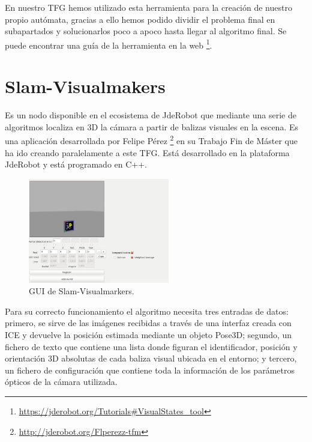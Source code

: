 \hspace{1cm} En nuestro TFG hemos utilizado esta herramienta para la creación de nuestro propio autómata, gracias a ello hemos podido dividir el problema final en subapartados y solucionarlos poco a apoco hasta llegar al algoritmo final. Se puede encontrar una guía de la herramienta en la web \footnote{\url{https://jderobot.org/Tutorials\#VisualStates_tool}}.

\section{Slam-Visualmakers}
\hspace{1cm} Es un nodo disponible en el ecosistema de JdeRobot que mediante una serie de algoritmos localiza en 3D la cámara a partir de balizas visuales en la escena. Es una aplicación desarrollada por Felipe Pérez \footnote{\url{http://jderobot.org/Flperezz-tfm}} en su Trabajo Fin de Máster que ha ido creando paralelamente a este TFG. Está desarrollado en la plataforma JdeRobot y está programado en C++. 

\begin{figure}[H]
	\begin{center}
		\includegraphics[width=0.55\textwidth]{imag/IMG24.png}
				\caption{GUI de Slam-Visualmarkers.} 
	\label{fig:GUI de Slam-Visualmarkers.}	
	\end{center}
\end{figure}


\hspace{1cm} Para su correcto funcionamiento el algoritmo necesita tres entradas de datos: primero, se sirve de las imágenes recibidas a través de una interfaz creada con ICE y devuelve la posición estimada mediante un objeto Pose3D; segundo, un fichero de texto que contiene una lista donde figuran el identificador, posición y orientación 3D absolutas de cada baliza visual ubicada en el entorno; y tercero, un fichero de configuración que contiene toda la información de los parámetros ópticos de la cámara utilizada. 

